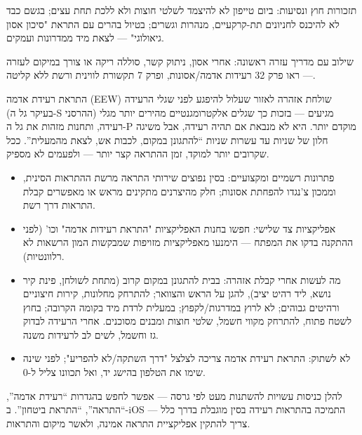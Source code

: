 תזכורות חוץ ונסיעות: ביום טייפון לא להיצמד לשלטי חוצות ולא ללכת תחת עצים; בגשם כבד לא להיכנס לחניונים תת-קרקעיים, מנהרות וגשרים; בטיול בהרים עם התראת "סיכון אסון גיאולוגי" — לצאת מיד ממדרונות ועמקים.

שילוב עם מדריך עזרה ראשונה: אחרי אסון, ניתוק קשר, סוללה ריקה או צורך במיקום לעזרה — ראו פרק 32 רעידות אדמה/אסונות, ופרק 7 תקשורת לווינית ורשת ללא קליטה.


התראת רעידת אדמה (EEW) שולחת אזהרה לאזור שעלול להיפגע לפני שגלי הרעידה (בעיקר גל ה-S ההרסני) מגיעים — בזכות כך שגלים אלקטרומגנטיים מהירים יותר מגלי רעידה, ותחנות מזהות את גל ה-P מוקדם יותר. היא לא מנבאת אם תהיה רעידה, אבל משיגה חלון של שניות עד עשרות שניות “להתגונן במקום, לכבות אש, לצאת מהמעלית”. ככל שקרובים יותר למוקד, זמן ההתראה קצר יותר — ולפעמים לא מספיק.

\begin{itemize}
  \item פתרונות רשמיים ומקצועיים: בסין נפוצים שירותי התראה מרשת ההתראות הסינית, וממכון צ'נגדו להפחתת אסונות; חלק מהיצרנים מתקינים מראש או מאפשרים קבלת התראות דרך רשת.
  \item אפליקציות צד שלישי: חפשו בחנות האפליקציות "התראת רעידות אדמה" וכו' (לפני ההתקנה בדקו את המפתח — הימנעו מאפליקציות מזויפות שמבקשות המון הרשאות לא רלוונטיות).
  \item מה לעשות אחרי קבלת אזהרה: בבית להתגונן במקום קרוב (מתחת לשולחן, פינת קיר נושא, ליד רהיט יציב), להגן על הראש והצוואר; להתרחק מחלונות, קירות חיצוניים ורהיטים גבוהים; לא לרוץ במדרגות/לקפוץ; במעלית לרדת מיד בקומה הקרובה; בחוץ לשטח פתוח, להתרחק מקווי חשמל, שלטי חוצות ומבנים מסוכנים. אחרי הרעידה לבדוק גז וחשמל, לשים לב לרעידות משנה.
  \item לא לשתוק: התראת רעידת אדמה צריכה לצלצל "דרך השתקה/לא להפריע"; לפני שינה שימו את הטלפון בהישג יד, ואל תכוונו צליל ל-0.
\end{itemize}


להלן כניסות עשויות להשתנות מעט לפי גרסה — אפשר לחפש בהגדרות “רעידת אדמה”, “התראה”, “התראת ביטחון”. ב-iOS התמיכה בהתראות רעידה בסין מוגבלת בדרך כלל — צריך להתקין אפליקציית התראה אמינה, ולאשר מיקום והתראות.

